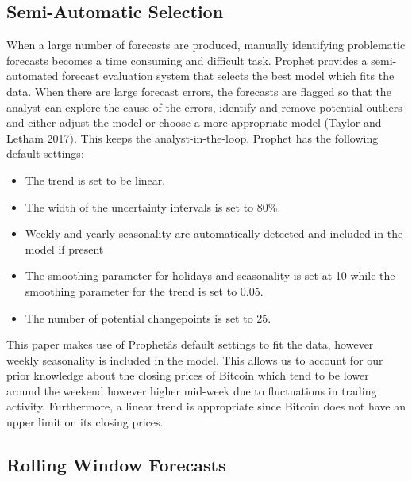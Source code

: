 \documentclass[12pt,a4paper]{article}
\numberwithin{equation}{section}
\numberwithin{figure}{section}
\numberwithin{table}{section}
\def\tightlist{}
\begin{document}
\subsection{\texorpdfstring{Semi-Automatic Selection
\label{Semi-Automatic Selection}}{Semi-Automatic Selection }}\label{semi-automatic-selection}

When a large number of forecasts are produced, manually identifying
problematic forecasts becomes a time consuming and difficult task.
Prophet provides a semi-automated forecast evaluation system that
selects the best model which fits the data. When there are large
forecast errors, the forecasts are flagged so that the analyst can
explore the cause of the errors, identify and remove potential outliers
and either adjust the model or choose a more appropriate model (Taylor
and Letham 2017). This keeps the analyst-in-the-loop. Prophet has the
following default settings:

\begin{itemize}
\tightlist
\item
  The trend is set to be linear.
\item
  The width of the uncertainty intervals is set to 80\%.
\item
  Weekly and yearly seasonality are automatically detected and included
  in the model if present
\item
  The smoothing parameter for holidays and seasonality is set at 10
  while the smoothing parameter for the trend is set to 0.05.
\item
  The number of potential changepoints is set to 25.
\end{itemize}

This paper makes use of Prophetâs default settings to fit the data,
however weekly seasonality is included in the model. This allows us to
account for our prior knowledge about the closing prices of Bitcoin
which tend to be lower around the weekend however higher mid-week due to
fluctuations in trading activity. Furthermore, a linear trend is
appropriate since Bitcoin does not have an upper limit on its closing
prices.

\subsection{Rolling Window Forecasts}\label{rolling-window-forecasts}
\end{document}
